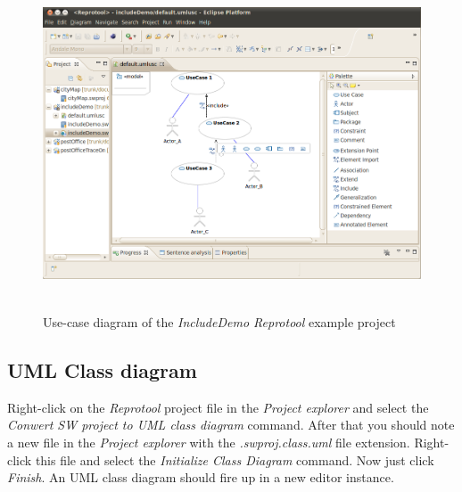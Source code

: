 \begin{figure}[ht]
  \centering
  \includegraphics[height=280pt]{images/reprotoolUCDiagram}
  \caption{Use-case diagram of the \emph{IncludeDemo Reprotool} example project}
  \label{fig:reprotoolUCDiagram}
\end{figure}

\subsection{UML Class diagram}

Right-click on the \emph{Reprotool} project file in the \emph{Project explorer} and select the \emph{Conwert SW project to UML class
diagram} command. After that you should note a new file in the \emph{Project explorer} with the \emph{.swproj.class.uml} file extension.
Right-click this file and select the \emph{Initialize Class Diagram} command. Now just click \emph{Finish}. An UML class diagram should
fire up in a new editor instance.
